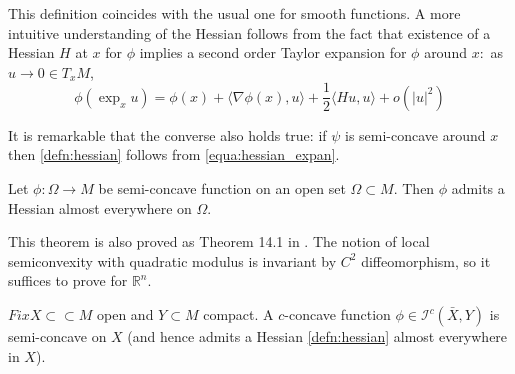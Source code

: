 This definition coincides with the usual one for smooth functions. A more intuitive understanding of the Hessian follows from the fact that existence of a Hessian \( H \) at \( x \) for \( \phi \) implies a second order Taylor expansion for \( \phi \) around \( x : \) as \( u \rightarrow 0 \in T _ { x } M \),
\begin{equation}
	\label{equa:hessian_expan}
	\phi \left( \exp _ { x } u \right) = \phi ( x ) + \langle \nabla \phi ( x ) , u \rangle + \frac { 1 } { 2 } \langle H u , u \rangle + o \left( | u | ^ { 2 } \right)
\end{equation}

It is remarkable that the converse also holds true: if \( \psi \) is semi-concave around \( x \) then \cref{defn:hessian} follows from \cref{equa:hessian_expan}.

\begin{thm}
	Let \( \phi : \Omega \rightarrow M \) be semi-concave function on an open set \( \Omega \subset M . \) Then \( \phi \) admits a Hessian almost everywhere on \( \Omega \).
\end{thm}

This theorem is also proved as Theorem 14.1 in \cite{villani2008optimal}.
The notion of local semiconvexity
with quadratic modulus is invariant by $C^2$ diffeomorphism, so it suffices to prove for $\mathbb{R}^n$.

\begin{prop}
	\( F i x X \subset \subset M \) open and \( Y \subset M \) compact. A \( c \)-concave function \( \phi \in \mathcal{I} ^ { c } ( \bar { X } , Y ) \) is semi-concave on \( X \) (and hence admits a Hessian \cref{defn:hessian} almost everywhere in \( X \)).
\end{prop}


